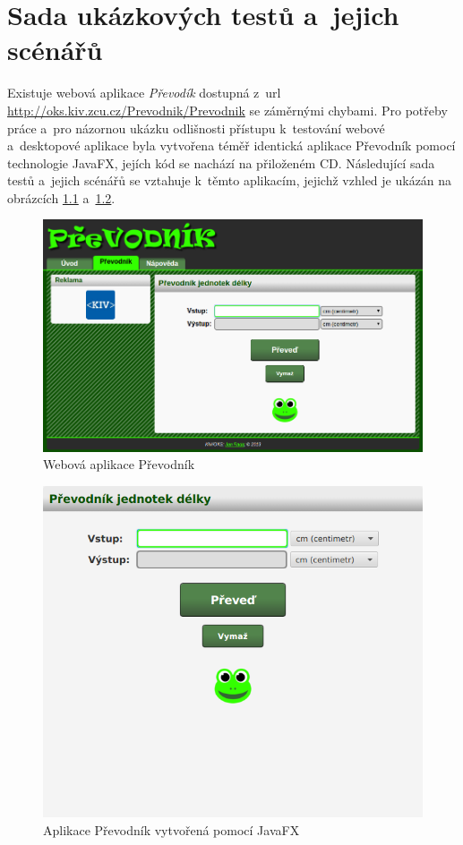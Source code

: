 \chapter{Sada ukázkových testů a~jejich scénářů}
Existuje webová aplikace \emph{Převodík} dostupná z~url \url{http://oks.kiv.zcu.cz/Prevodnik/Prevodnik} se záměrnými chybami. Pro potřeby práce a~pro názornou ukázku odlišnosti přístupu k~testování webové a~desktopové aplikace byla vytvořena téměř identická aplikace Převodník pomocí technologie JavaFX, jejích kód se nachází na přiloženém CD. Následující sada testů a~jejich scénářů se vztahuje k~těmto aplikacím, jejichž vzhled je ukázán na obrázcích \ref{PrevodnikWeb} a~\ref{PrevodnikJavaFX}.

	\begin{figure}[ht!]
		\centering
		\caption{Webová aplikace Převodník}
		\label{PrevodnikWeb}
		\includegraphics[width=13.5cm]{img/PrevodnikWeb.png}
	\end{figure}
	\begin{figure}[ht!]
		\centering
		\caption{Aplikace Převodník vytvořená pomocí JavaFX}
		\label{PrevodnikJavaFX}
		\includegraphics[width=13.5cm]{img/PrevodnikJavaFX.png}
	\end{figure}

